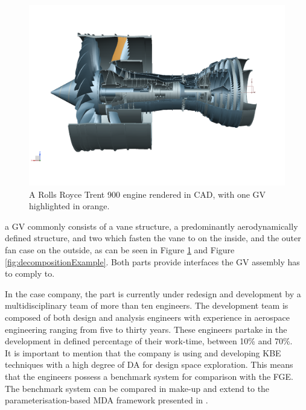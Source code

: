 \documentclass[aerospace,article,submit,moreauthors,pdftex]{Definitions/mdpi}
\newcommand{\Jakob}[1]{{{\color{orange}{\itshape{#1}}\color{black}}
    }{\ignorespaces}}
\newcommand{\revision}[1]{\color{black}{#1 }\color{black}}
\begin{document}
\begin{figure}[th!]
    \begin{center}
    \centering
        \includegraphics[width=.8\textwidth]{figures/trent9000_OGV.png}

        \caption{A Rolls Royce Trent 900 engine rendered in CAD\protect\footnotemark, with one GV highlighted in orange.
        }
        \label{fig:turbine}
    \end{center}
\end{figure}


a \ac{GV} commonly consists of a vane structure, a predominantly aerodynamically defined structure, and two \revision{end atachments} which fasten the vane to \revision{the engine core} on the inside, and the outer fan case on the outside, as can be seen in Figure \ref{fig:turbine} and Figure \ref{fig:decompositionExample}.
Both parts provide interfaces the \ac{GV} assembly has to comply to.

In the case company, the part is currently under redesign and development by a multidisciplinary team of more than ten engineers.
The development team is composed of both design and analysis engineers with experience in aerospace engineering ranging from five to thirty years.
These engineers partake in the development in defined percentage of their work-time, between 10\% and 70\%. 
\\

It is important to mention that the company is using and developing  \ac{KBE} techniques with a high degree of \ac{DA} for design space exploration.
This means that the engineers possess a benchmark system for comparison with the FGE. 
The benchmark system can be compared in make-up and extend to the parameterisation-based \ac{MDA} framework presented in \cite{Sandberg2017ADesign}.
\end{document}
